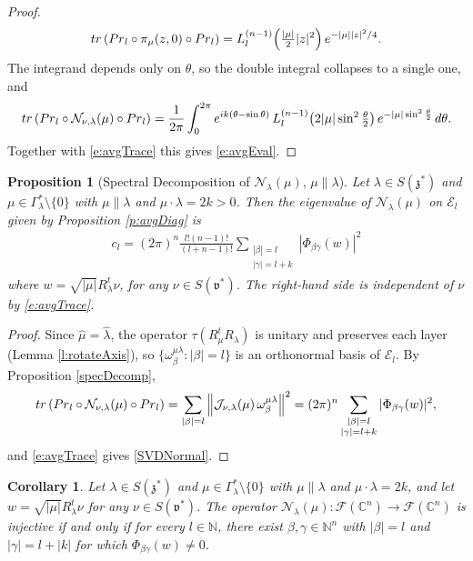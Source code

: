 \documentclass[11pt]{amsart}
\theoremstyle{plain}
\newtheorem{corollary}[theorem]{Corollary}
\newtheorem{proposition}[theorem]{Proposition}
\theoremstyle{definition}
\theoremstyle{remark}
\numberwithin{equation}{section}
\def\fz{\mathfrak{z}}
\def\fv{\mathfrak{v}}
\def\cE{\mathcal{E}}
\def\cN{\mathcal{N}}
\def\cJ{\mathcal{J}}
\def\cF{\mathcal{F}}
\def\mz{\setminus\{0\}}
\def\C{{\mathbb C}}%
\def\N{{\mathbb N}}%
\numberwithin{equation}{section}
\begin{document}
\begin{proof}
	\begin{align*}
		{\rm tr}\left({\rm Pr}_l\circ\pi_\mu(z, 0)\circ{\rm Pr}_l\right)=L_l^{(n-1)}\!\left(\tfrac{|\mu|}{2}|z|^2\right)e^{-|\mu||z|^2/4}.
	\end{align*}
	The integrand depends only on $\theta$, so the double integral collapses to a single one, and
	\begin{align*}
		{\rm tr}\left({\rm Pr}_l\circ\cN_{\nu, \lambda}(\mu)\circ{\rm Pr}_l\right)=\frac{1}{2\pi}\int_0^{2\pi}e^{ik(\theta-\sin\theta)}\,L_l^{(n-1)}\!\left(2|\mu|\sin^2\tfrac{\theta}{2}\right)e^{-|\mu|\sin^2\frac{\theta}{2}}\,d\theta.
	\end{align*}
	Together with \eqref{e:avgTrace} this gives \eqref{e:avgEval}.
\end{proof}

\begin{proposition}[Spectral Decomposition of $\cN_\lambda(\mu)$, $\mu\parallel\lambda$]\label{specDecompNormal}  Let $\lambda\in S(\fz^*)$ and $\mu\in \Gamma_\lambda^*\mz$ with $\mu\parallel\lambda$ and $\mu\cdot\lambda=2k>0$. Then the eigenvalue of $\cN_\lambda(\mu)$ on $\cE_l$ given by Proposition \ref{p:avgDiag} is
	\begin{align}\label{SVDNormal}
		c_l=(2\pi)^{n}\tfrac{l!(n-1)!}{(l+n-1)!}\sum_{\substack{|\beta|=l \\ |\gamma|=l+k }}|\Phi_{\beta\gamma}(w)|^2
	\end{align}
where $w=\sqrt{|\mu|}R_\lambda^t \nu$, for any $\nu\in S(\fv^*)$. The right-hand side is independent of $\nu$ by \eqref{e:avgTrace}.
\end{proposition}
\begin{proof}
	Since $\hat{\mu}=\hat{\lambda}$, the operator $\tau(R_\mu^tR_\lambda)$ is unitary and preserves each layer (Lemma \ref{l:rotateAxis}), so $\{\omega^{\mu\lambda}_\beta: |\beta|=l\}$ is an orthonormal basis of $\cE_l$. By Proposition \ref{specDecomp},
	\begin{align*}
		{\rm tr}\left({\rm Pr}_l\circ\cN_{\nu, \lambda}(\mu)\circ{\rm Pr}_l\right)=\sum_{|\beta|=l}\left\|\cJ_{\nu, \lambda}(\mu)\,\omega^{\mu\lambda}_\beta\right\|^2=(2\pi)^n\sum_{\substack{|\beta|=l \\ |\gamma|=l+k}}|\Phi_{\beta\gamma}(w)|^2,
	\end{align*}
	and \eqref{e:avgTrace} gives \eqref{SVDNormal}.
\end{proof}
\begin{corollary}\label{invCriteria}
	Let $\lambda\in S(\fz^*)$ and $\mu\in \Gamma_\lambda^*\mz$ with $\mu\parallel\lambda$ and $\mu\cdot \lambda=2k$, and let $w=\sqrt{|\mu|}R_\lambda^t\nu$ for any $\nu\in S(\fv^*)$. The operator $\cN_\lambda(\mu): \cF(\C^n)\to \cF(\C^n)$ is injective  if and only if for every $l\in \N$, there exist $\beta, \gamma\in \N^n$ with $|\beta|=l$ and $|\gamma|=l+|k|$ for which $\Phi_{\beta\gamma}(w)\neq 0$.
\end{corollary}
\end{document}
